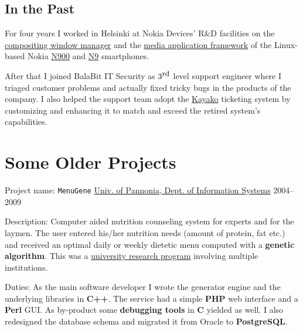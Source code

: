 \documentclass[a4paper,12pt]{article}
\newcommand\Yell{\textbf}
\newcommand\Label{\textsf}
\begin{document}
\subsection*{In the Past}

For four years I worked in Helsinki at \hypertarget{gadgets}{Nokia Devices'
R\&D facilities} on the
\href{http://wiki.maemo.org/Documentation/Maemo_5_Developer_Guide/Architecture/UI_Framework#hildon-desktop}{compositing window manager} and the
\href{http://wiki.maemo.org/Documentation/Maemo_5_Developer_Guide/Using_Multimedia_Components/Media_Application_Framework_(MAFW)}{media application framework}
of the Linux-based Nokia \href{http://maemo.org/intro/maemo_history}{N900}
and \href{http://en.wikipedia.org/wiki/Nokia_N9}{N9} smartphones.

\medskip
After that I joined BalaBit IT Security as $3^{\textrm{\small rd}}$ level
support engineer where I triaged customer problems and actually fixed
tricky bugs in the products of the company.  I also helped the support
team adopt the \href{http://www.kayako.com}{Kayako} ticketing system by
customizing and enhancing it to match and exceed the retired system's
capabilities.

\section{Some Older Projects}

\Label{Project name}: \texttt{MenuGene}\hfill
\href{http://virt.uni-pannon.hu/index.php/about-the-department}%
{Univ. of Pannonia, Dept. of Information Systems}
\Label{2004--2009}\par\medskip
\Label{Description}: Computer aided nutrition counseling system for experts
and for the laymen.  The user entered his/her nutrition needs (amount of
protein, fat etc.) and received an optimal daily or weekly dietetic menu
computed with a \Yell{genetic algorithm}.  This was a 
\href{http://github.com/enadam/thesis/raw/master/thesis.pdf}%
{university research program} involving multiple institutions.\par\medskip
\Label{Duties}: As the main software developer I wrote the generator engine
and the underlying libraries in \Yell{C++}.  The service had a simple
\Yell{PHP} web interface and a \Yell{Perl} GUI.  As by-product some
\Yell{debugging tools} in \Yell{C} yielded as well.  I also redesigned
the database schema and migrated it from Oracle to \Yell{PostgreSQL}.
\end{document}
